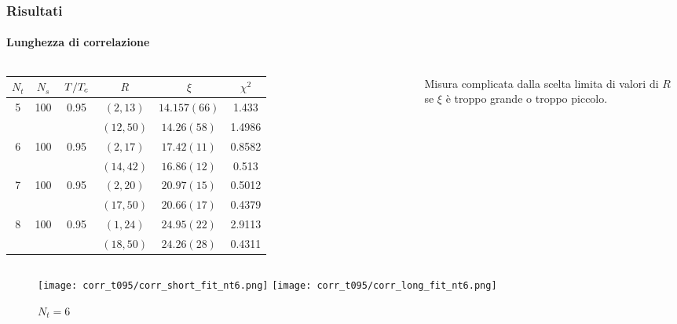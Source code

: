 \documentclass{beamer}
\begin{document}
\begin{frame}
	\frametitle{Risultati}
	\framesubtitle{Lunghezza di correlazione}

	\begin{columns}
			\scriptsize
			\centering
			\begin{tabular}{|c|c|c|c|c|c|}
				\hline
				$N_t$ & $N_s$ & $\flatfrac{T}{T_c} $ & $R$ & $\xi$ & $\chi^2$ \\
				\hline
				\multirow{2}{*}{5} & \multirow{2}{*}{100} & \multirow{2}{*}{0.95}
						& $(2, 13)$ & $14.157(66)$ & 1.433 \\
					& & & $(12, 50)$ & $14.26(58)$ & 1.4986 \\
				\hline
				\multirow{2}{*}{6} & \multirow{2}{*}{100} & \multirow{2}{*}{0.95}
						& $(2, 17)$ & $17.42(11)$ & 0.8582 \\
					& & & $(14, 42)$ & $16.86(12)$ & 0.513 \\
				\hline
				\multirow{2}{*}{7} & \multirow{2}{*}{100} & \multirow{2}{*}{0.95}
						& $(2, 20)$ & $20.97(15)$ & 0.5012 \\
					& & & $(17, 50)$ & $20.66(17)$ & 0.4379 \\
				\hline
				\multirow{2}{*}{8} & \multirow{2}{*}{100} & \multirow{2}{*}{0.95}
						& $(1, 24)$ & $24.95(22)$ & 2.9113 \\
					& & & $(18, 50)$ & $24.26(28)$ & 0.4311 \\
				\hline
			\end{tabular}

			Misura complicata dalla scelta limita di valori di $R$ se $\xi$ è troppo grande o troppo piccolo.			

	\end{columns}

	\vspace{\fill}

	\begin{adjustwidth}{-1cm}{-1cm}
		\begin{figure}[b]
			\centering
			\texttt{[image: corr\_t095/corr\_short\_fit\_nt6.png]}
			\texttt{[image: corr\_t095/corr\_long\_fit\_nt6.png]}
			\caption{$N_t = 6$}
		\end{figure}
	\end{adjustwidth}

\end{frame}
\end{document}
